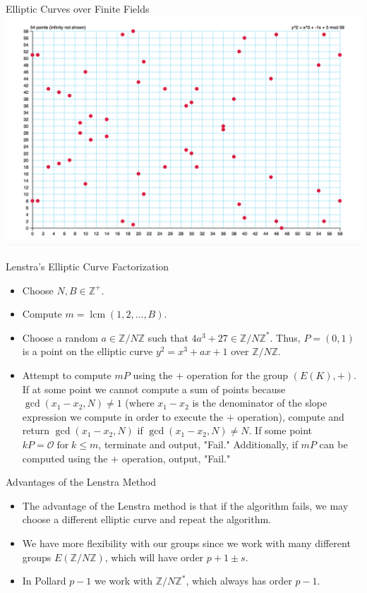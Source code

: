 \documentclass{beamer}
\DeclareMathOperator{\lcm}{lcm}
\DeclareMathOperator{\for}{for}
\begin{document}
	\begin{frame}{Elliptic Curves over Finite Fields}
		\includegraphics[scale=.4]{EllipticCurveFiniteField.png}
	\end{frame}
	
	\begin{frame}{Lenstra's Elliptic Curve Factorization}
		\begin{itemize}
			\item Choose $N, B \in \mathbb{Z}^+$.
			\item Compute $m=\lcm(1,2,\dotso,B)$. 
			\item Choose a random $a \in \mathbb{Z}/N\mathbb{Z}$ such that $4a^3+27 \in \mathbb{Z}/N\mathbb{Z}^*$. Thus, $P=(0,1)$ is a point on the elliptic curve $y^2=x^3+ax+1$ over $\mathbb{Z}/N\mathbb{Z}$.
			\item Attempt to compute $mP$ using the $+$ operation for the group $(E(K),+)$. If at some point we cannot compute a sum of points because $\gcd(x_1-x_2,N) \neq 1$ (where $x_1-x_2$ is the denominator of the slope expression we compute in order to execute the $+$ operation), compute and return $\gcd(x_1-x_2,N)$ if $\gcd(x_1-x_2,N) \neq N$. If some point $kP=\mathcal{O} \for k \leq m$, terminate and output, "Fail." Additionally, if $mP$ can be computed using the $+$ operation, output, "Fail."
		\end{itemize}
	\end{frame}
	
	\begin{frame}{Advantages of the Lenstra Method}
		\begin{itemize}
			\item The advantage of the Lenstra method is that if the algorithm fails, we may choose a different elliptic curve and repeat the algorithm.
			\item We have more flexibility with our groups since we work with many different groups $E(\mathbb{Z}/N\mathbb{Z})$, which will have order $p+1\pm s$.
			\item In Pollard $p-1$ we work with $\mathbb{Z}/N\mathbb{Z}^*$, which always has order $p-1$.
		\end{itemize}
	\end{frame}
	
\end{document}
